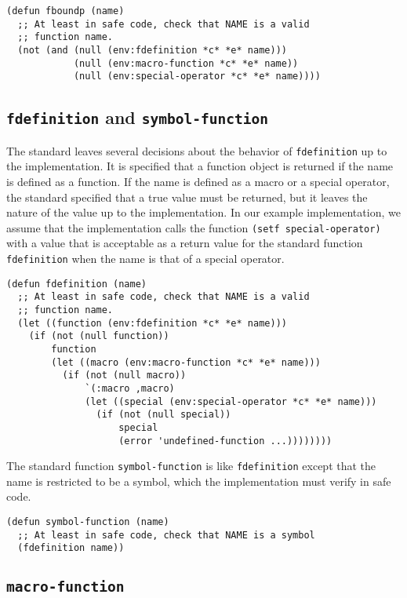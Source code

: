 \begin{verbatim}
(defun fboundp (name)
  ;; At least in safe code, check that NAME is a valid
  ;; function name.
  (not (and (null (env:fdefinition *c* *e* name)))
            (null (env:macro-function *c* *e* name))
            (null (env:special-operator *c* *e* name))))
\end{verbatim}

\subsection{\texttt{fdefinition} and \texttt{symbol-function}}

The standard leaves several decisions about the behavior of
\texttt{fdefinition} up to the implementation.  It is specified that a
function object is returned if the name is defined as a function.  If
the name is defined as a macro or a special operator, the standard
specified that a true value must be returned, but it leaves the nature
of the value up to the implementation.  In our example implementation,
we assume that the \commonlisp{} implementation calls the \sysname{}
function \texttt{(setf special-operator)} with a value that is
acceptable as a return value for the standard function
\texttt{fdefinition} when the name is that of a special operator.

\begin{verbatim}
(defun fdefinition (name)
  ;; At least in safe code, check that NAME is a valid
  ;; function name.
  (let ((function (env:fdefinition *c* *e* name)))
    (if (not (null function))
        function
        (let ((macro (env:macro-function *c* *e* name)))
          (if (not (null macro))
              `(:macro ,macro)
              (let ((special (env:special-operator *c* *e* name)))
                (if (not (null special))
                    special
                    (error 'undefined-function ...))))))))
\end{verbatim}

The standard function \texttt{symbol-function} is like
\texttt{fdefinition} except that the name is restricted to be a
symbol, which the implementation must verify in safe code.

\begin{verbatim}
(defun symbol-function (name)
  ;; At least in safe code, check that NAME is a symbol
  (fdefinition name))
\end{verbatim}

\subsection{\texttt{macro-function}}

